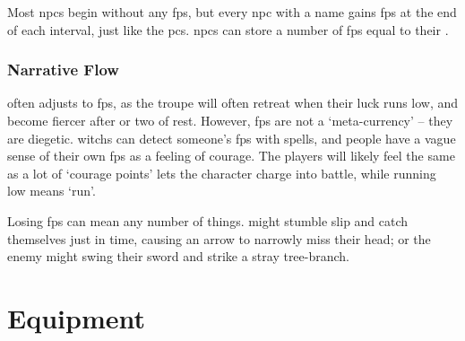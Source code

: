 \begin{multicols}{2}
Most \glspl{npc} begin without any \glspl{fp}, but every \gls{npc} with a name gains \glspl{fp} at the end of each \gls{interval}, just like the \glspl{pc}.
\Glspl{npc} can store a number of \glspl{fp} equal to their .

\subsubsection{Narrative Flow}
often adjusts to \glspl{fp}, as the troupe will often \gls{retreat} when their luck runs low, and become fiercer after  or two of rest.
However, \glspl{fp} are not a `meta-currency' -- they are diegetic.
\Glspl{witch} can detect someone's \glspl{fp} with \glspl{spell}, and people have a vague sense of their own \glspl{fp} as a feeling of courage.
The players will likely feel the same as a lot of `courage points' lets the character charge into battle, while running low means `run'.

Losing \glspl{fp} can mean any number of things.
 might stumble slip and catch themselves just in time, causing an arrow to narrowly miss their head; or the enemy might swing their sword and strike a stray tree-branch.

\end{multicols}

\section{Equipment}

